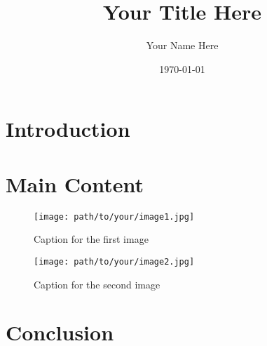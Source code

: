 \documentclass{article}
\title{Your Title Here}
\author{Your Name Here}
\date{\today}
\begin{document}
\maketitle

\section{Introduction}
\lipsum[1-3]

\section{Main Content}
\lipsum[4-6]

\begin{figure}[h!]
    \centering
    \texttt{[image: path/to/your/image1.jpg]}
    \caption{Caption for the first image}
    \label{fig:image1}
\end{figure}

\lipsum[7-9]

\begin{figure}[h!]
    \centering
    \texttt{[image: path/to/your/image2.jpg]}
    \caption{Caption for the second image}
    \label{fig:image2}
\end{figure}

\section{Conclusion}
\lipsum[10-12]
\end{document}
